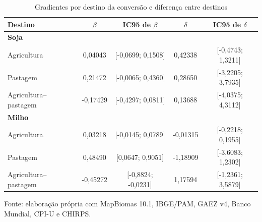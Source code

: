 \begin{table}[htbp]
\centering
\footnotesize
\setlength{\tabcolsep}{3pt}
\renewcommand{\arraystretch}{1.1}
\normalcaption\captionstyle{\centering}
\caption{Gradientes por destino da conversão e diferença entre destinos}
\label{tab:h1-destinos-robustez}
\begin{tabular}{lcccc}
\hline
Destino & $\beta$ & IC95 de $\beta$ & $\delta$ & IC95 de $\delta$ \\
\hline\multicolumn{5}{l}{\textbf{Soja}} \\
Agricultura & 0,04043 & [-0,0699; 0,1508] & 0,42338 & [-0,4743; 1,3211] \\
Pastagem & 0,21472 & [-0,0065; 0,4360] & 0,28650 & [-3,2205; 3,7935] \\
Agricultura--pastagem & -0,17429 & [-0,4297; 0,0811] & 0,13688 & [-4,0375; 4,3112] \\
\hline\multicolumn{5}{l}{\textbf{Milho}} \\
Agricultura & 0,03218 & [-0,0145; 0,0789] & -0,01315 & [-0,2218; 0,1955] \\
Pastagem & 0,48490 & [0,0647; 0,9051] & -1,18909 & [-3,6083; 1,2302] \\
Agricultura--pastagem & -0,45272 & [-0,8824; -0,0231] & 1,17594 & [-1,2361; 3,5879] \\
\hline\end{tabular}
\par\smallskip
\begin{minipage}{\textwidth}\footnotesize\centering
Fonte: elaboração própria com MapBiomas 10.1, IBGE/PAM, GAEZ v4, Banco Mundial, CPI-U e CHIRPS.
\end{minipage}
\end{table}
